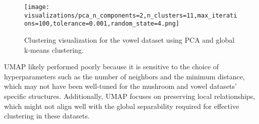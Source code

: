 \begin{figure}[h!]
    \centering
    \texttt{[image: visualizations/pca\_n\_components=2,n\_clusters=11,max\_iterations=100,tolerance=0.001,random\_state=4.png]}
    \caption{Clustering visualization for the vowel dataset using PCA and global k-means clustering.}
    \label{fig:vowel_clustering}
\end{figure}

UMAP likely performed poorly because it is sensitive to the choice of hyperparameters such as the number of neighbors and the minimum distance, which may not have been well-tuned for the mushroom and vowel datasets' specific structures. Additionally, UMAP focuses on preserving local relationships, which might not align well with the global separability required for effective clustering in these datasets.
